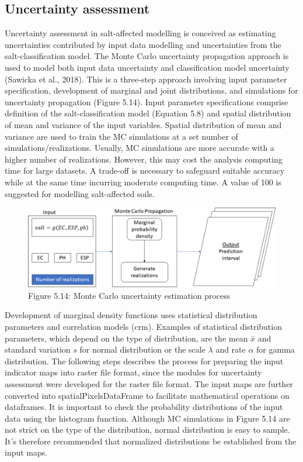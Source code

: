 \documentclass[
  10pt,
  b5paper,
]{book}
\begin{document}
\hypertarget{uncertainty-assessment}{%
\subsection{Uncertainty assessment}\label{uncertainty-assessment}}

Uncertainty assessment in salt-affected modelling is conceived as estimating uncertainties contributed by input data modelling and uncertainties from the salt-classification model. The Monte Carlo uncertainty propagation approach is used to model both input data uncertainty and classification model uncertainty (Sawicka et al., 2018). This is a three-step approach involving input parameter specification, development of marginal and joint distributions, and simulations for uncertainty propagation (Figure 5.14). Input parameter specifications comprise definition of the salt-classification model (Equation 5.8) and spatial distribution of mean and variance of the input variables. Spatial distribution of mean and variance are used to train the MC simulations at a set number of simulations/realizations. Usually, MC simulations are more accurate with a higher number of realizations. However, this may cost the analysis computing time for large datasets. A trade-off is necessary to safeguard suitable accuracy while at the same time incurring moderate computing time. A value of 100 is suggested for modelling salt-affected soils.

\begin{figure}
\centering
\includegraphics{figures/images/Figure5.14.png}
\caption{Figure 5.14: Monte Carlo uncertainty estimation process}
\end{figure}

Development of marginal density functions uses statistical distribution parameters and correlation models (crm). Examples of statistical distribution parameters, which depend on the type of distribution, are the mean \(\bar{x}\) and standard variation \(s\) for normal distribution or the scale \(\lambda\) and rate \(\alpha\) for gamma distribution.
The following steps describes the process for preparing the input indicator maps into raster file format, since the modules for uncertainty assessment were developed for the raster file format. The input maps are further converted into spatialPixelsDataFrame to facilitate mathematical operations on dataframes. It is important to check the probability distributions of the input data using the histogram function. Although MC simulations in Figure 5.14 are not strict on the type of the distribution, normal distribution is easy to sample. It's therefore recommended that normalized distributions be established from the input maps.
\end{document}
